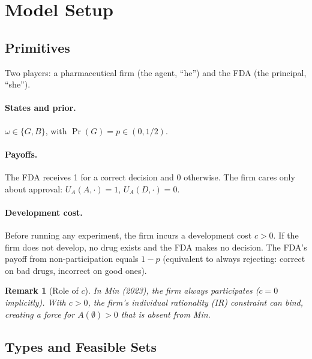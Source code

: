 \documentclass[12pt,a4paper]{article}
\newtheorem{remark}{Remark}
\begin{document}
\section{Model Setup}

\subsection{Primitives}

Two players: a pharmaceutical firm (the agent, ``he'') and
the FDA (the principal, ``she'').

\paragraph{States and prior.}
$\omega \in \{G, B\}$, with
$\Pr(G) = p \in (0, 1/2)$.

\paragraph{Payoffs.}
The FDA receives 1 for a correct decision and 0 otherwise.
The firm cares only about approval:
$U_A(A, \cdot) = 1$, $U_A(D, \cdot) = 0$.

\paragraph{Development cost.}
Before running any experiment, the firm incurs a development
cost $c > 0$. If the firm does not develop, no drug exists
and the FDA makes no decision. The FDA's payoff from
non-participation equals $1 - p$ (equivalent to always
rejecting: correct on bad drugs, incorrect on good ones).

\begin{remark}[Role of $c$]
In Min (2023), the firm always participates
($c = 0$ implicitly). With $c > 0$, the firm's individual
rationality (IR) constraint can bind, creating a force for
$A(\emptyset) > 0$ that is absent from Min.
\end{remark}


\subsection{Types and Feasible Sets}
\end{document}
